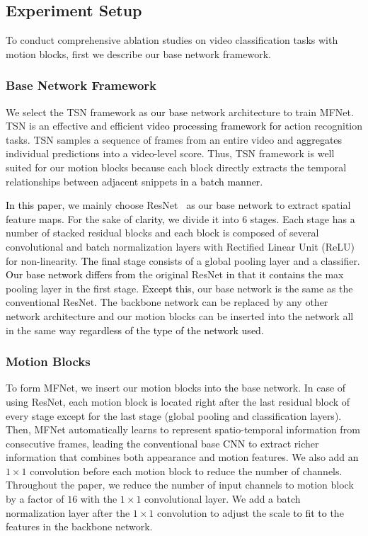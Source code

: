 \documentclass[runningheads]{llncs}
\newcommand{\nj}[1]{\textcolor{black}{#1}}
\newcommand{\mg}[1]{\textcolor{black}{#1}}
\begin{document}
\subsection{Experiment Setup}
\label{sec:expsetup}

To conduct comprehensive ablation studies on video classification tasks with motion blocks, first we describe our base network framework.


\subsubsection{Base Network Framework}
We select the TSN framework \cite{wang2016temporal} as \nj{our base} network architecture to train MFNet. TSN is an effective and efficient \nj{video processing framework for} action recognition tasks. TSN samples a sequence of frames from an entire video and \nj{aggregates} individual predictions into a video-level score. Thus, TSN framework is well suited for our motion blocks because each block directly extracts the temporal relationships between adjacent snippets \nj{in a batch manner}. 

\mg{In this paper}, we mainly choose ResNet~\cite{he2016deep} as our base network to extract spatial feature maps. For the sake of \nj{clarity}, we divide it into $6$ stages. Each stage has \nj{a} number of stacked residual blocks and each block is composed of several convolutional and batch normalization \cite{ioffe2015batch} layers with Rectified Linear Unit (ReLU) \cite{nair2010rectified} for non-linearity. \nj{The} final stage consists of a global pooling layer and a classifier. \nj{Our base network differs from} the original ResNet \nj{in that it contains the} max pooling layer in the first stage. \nj{Except this,} our base network is the same as the conventional ResNet. The backbone network can be replaced by any other network architecture and our motion blocks can be inserted into the network all in the same way \nj{regardless of the type of the network used.} 

\subsubsection{Motion Blocks}
To form MFNet, we insert our motion blocks into \nj{the} base network. In case of using ResNet, each motion block is located right after the last residual block of every stage except for the last stage (global pooling and classification layers). Then, MFNet automatically learns to represent spatio-temporal information from consecutive frames, \nj{leading} \nj{the} conventional base \nj{CNN} to extract richer information that combines both appearance and motion features. We also add \nj{an} $1 \times 1$ convolution before each motion block to reduce the number of channels. Throughout the paper, we reduce the number of input channels to motion block by a factor of $16$ with the $1\times1$ convolutional layer. We add a batch normalization layer after the $1\times1$ convolution to adjust the scale \nj{to fit to} the features in \nj{the} backbone network. 
\end{document}
